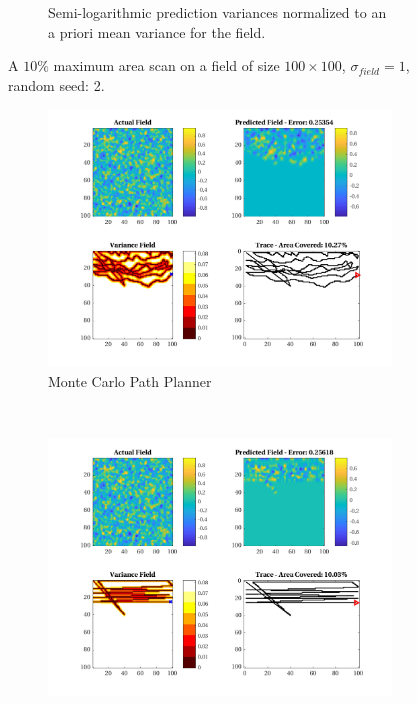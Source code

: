 \begin{figure}[htb!]
\begin{subfigure}[t]{0.65\textwidth}
        \captionsetup{skip=0.20\baselineskip,size=footnotesize}
        \caption{Semi-logarithmic prediction variances normalized to an a priori mean variance for the field.}
        \label{fig:prederrs_sigma1_p10_s2}
    \end{subfigure}
    \captionsetup{skip=0.20\baselineskip}
    \caption{A $10\%$ maximum area scan on a field of size $100 \times 100$, $\sigma_{field} = 1$, random seed: 2.}
    \label{fig:sigma1_p10_s2}
\end{figure}

\begin{figure}[htb!]
    \centering
    \begin{subfigure}[t]{0.5\textwidth}
        \centering
        \includegraphics[width=\linewidth]{figures/hbresults/mc_10p_100x100_sf_1_seed_2.png}
        \captionsetup{skip=0.10\baselineskip,size=footnotesize}
        \caption{Monte Carlo Path Planner}
    \end{subfigure}%
    ~ 
    \begin{subfigure}[t]{0.5\textwidth}
        \centering
        \includegraphics[width=\linewidth]{figures/hbresults/nhv_10p_100x100_sf_1_seed_2.png}

\end{subfigure}
\end{figure}
